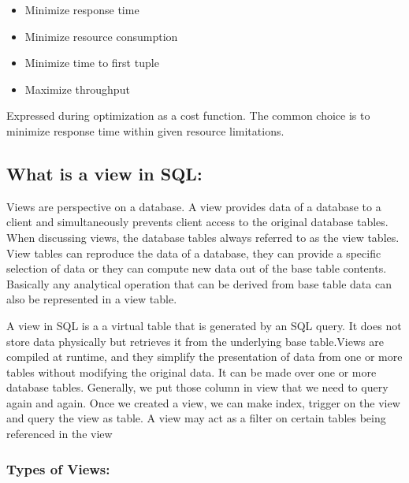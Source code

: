 \begin{itemize}
    \item Minimize response time
    \item Minimize resource consumption
    \item Minimize time to first tuple
    \item Maximize throughput
\end{itemize}\vspace{.4cm}

Expressed during optimization as a cost function. The common choice is to minimize response time within given resource limitations.



\subsection{What is a view in SQL:}
Views are perspective on a database. A view provides data of a database to a client and simultaneously prevents client access to the original database tables. When discussing views, the database tables always referred to as the view tables. View tables can reproduce the data of a database, they can provide a specific selection of data or they can compute new data out of the base table contents. Basically any analytical operation that can be derived from base table data can also be represented in a view table.\vspace{.4cm}

A view in SQL is a a virtual table that is generated by an SQL query. It does not store data physically but retrieves it from the underlying base table.Views are compiled at runtime, and they simplify the presentation of data from one or more tables without modifying the original data. It can be made over one or more database tables. Generally, we put those column in view that we need to query again and again. Once we created a view, we can make index, trigger on the view and query the view as table. A view may act as a filter on certain tables being referenced in the view \cite{chauhan-2024,Rohan_Vats-2024}

\subsubsection{Types of Views:}

